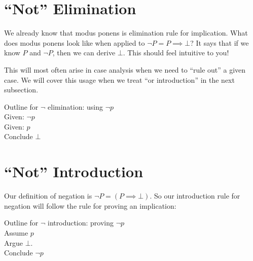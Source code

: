 \section{``Not'' Elimination}

We already know that modus ponens is elimination rule for implication.   What does modus ponens look like when applied to $\neg P = P \implies \bot$?  It says that if we know $P$ and $\neg P$, then we can derive $\bot$.  This should feel intuitive to you!

This will most often arise in case analysis when we need to ``rule out'' a given case.  We will cover this usage when we treat ``or introduction'' in the next subsection.

\begin{fitch*}
	\textrm{Outline for $\neg$ elimination:  using $\neg p$}\\
	\hspace{1 cm}\textrm{Given:  $\neg p$}\\
	\hspace{1 cm}\textrm{Given: $p$}\\
	\hspace{1 cm}\textrm{Conclude $\bot$}
	\end{fitch*}

\section{``Not'' Introduction}

Our definition of negation is $\neg P = (P \implies \bot)$.  So our introduction rule for negation will follow the rule for proving an implication:

\begin{fitch*}
	\textrm{Outline for $\neg$ introduction:  proving $\neg p$}\\
	\hspace{1 cm}\textrm{Assume $p$}\\
	\fa \textrm{Argue $\bot$.}\\
	\textrm{Conclude $\neg p$}
\end{fitch*}


